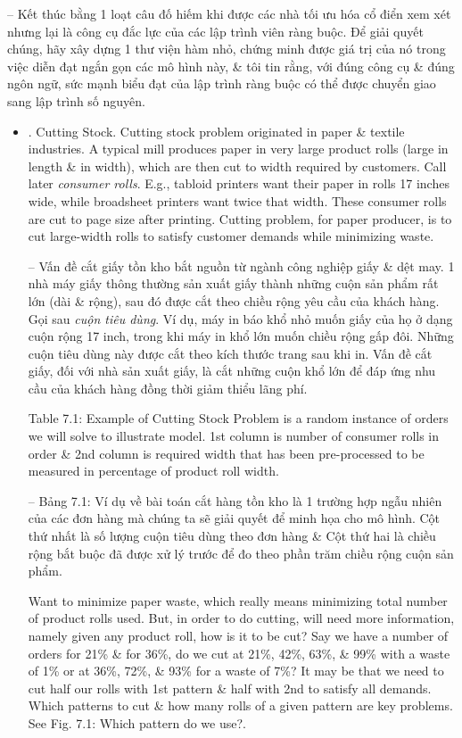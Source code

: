 \documentclass{article}
\begin{document}
\begin{itemize}
    -- Kết thúc bằng 1 loạt câu đố hiếm khi được các nhà tối ưu hóa cổ điển xem xét nhưng lại là công cụ đắc lực của các lập trình viên ràng buộc. Để giải quyết chúng, hãy xây dựng 1 thư viện hàm nhỏ, chứng minh được giá trị của nó trong việc diễn đạt ngắn gọn các mô hình này, \& tôi tin rằng, với đúng công cụ \& đúng ngôn ngữ, sức mạnh biểu đạt của lập trình ràng buộc có thể được chuyển giao sang lập trình số nguyên.
    \begin{itemize}
        \item {. Cutting Stock.} Cutting stock problem originated in paper \& textile industries. A typical mill produces paper in very large product rolls (large in length \& in width), which are then cut to width required by customers. Call later {\it consumer rolls}. E.g., tabloid printers want their paper in rolls 17 inches wide, while broadsheet printers want twice that width. These consumer rolls are cut to page size after printing. Cutting problem, for paper producer, is to cut large-width rolls to satisfy customer demands while minimizing waste.

        -- Vấn đề cắt giấy tồn kho bắt nguồn từ ngành công nghiệp giấy \& dệt may. 1 nhà máy giấy thông thường sản xuất giấy thành những cuộn sản phẩm rất lớn (dài \& rộng), sau đó được cắt theo chiều rộng yêu cầu của khách hàng. Gọi sau {\it cuộn tiêu dùng}. Ví dụ, máy in báo khổ nhỏ muốn giấy của họ ở dạng cuộn rộng 17 inch, trong khi máy in khổ lớn muốn chiều rộng gấp đôi. Những cuộn tiêu dùng này được cắt theo kích thước trang sau khi in. Vấn đề cắt giấy, đối với nhà sản xuất giấy, là cắt những cuộn khổ lớn để đáp ứng nhu cầu của khách hàng đồng thời giảm thiểu lãng phí.

        {\sf Table 7.1: Example of Cutting Stock Problem} is a random instance of orders we will solve to illustrate model. 1st column is number of consumer rolls in order \& 2nd column is required width that has been pre-processed to be measured in percentage of product roll width.

        -- {\sf Bảng 7.1: Ví dụ về bài toán cắt hàng tồn kho} là 1 trường hợp ngẫu nhiên của các đơn hàng mà chúng ta sẽ giải quyết để minh họa cho mô hình. Cột thứ nhất là số lượng cuộn tiêu dùng theo đơn hàng \& Cột thứ hai là chiều rộng bắt buộc đã được xử lý trước để đo theo phần trăm chiều rộng cuộn sản phẩm.

        Want to minimize paper waste, which really means minimizing total number of product rolls used. But, in order to do cutting, will need more information, namely given any product roll, how is it to be cut? Say we have a number of orders for 21\% \& for 36\%, do we cut at 21\%, 42\%, 63\%, \& 99\% with a waste of 1\% or at 36\%, 72\%, \& 93\% for a waste of 7\%? It may be that we need to cut half our rolls with 1st pattern \& half with 2nd to satisfy all demands. Which patterns to cut \& how many rolls of a given pattern are key problems. See {\sf Fig. 7.1: Which pattern do we use?}.


\end{itemize}
\end{itemize}
\end{document}
